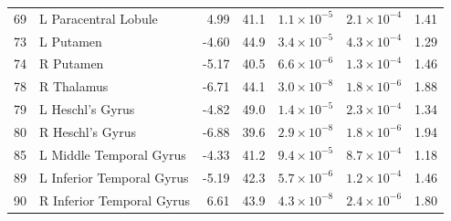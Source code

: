 \documentclass[11pt]{article}
\begin{document}
\begin{longtable}{r p{} r r l l r}
69 & L Paracentral Lobule & 4.99  & 41.1 & $1.1\times10^{-5}$ & $2.1\times10^{-4}$ & 1.41 \\
73 & L Putamen & -4.60 & 44.9 & $3.4\times10^{-5}$ & $4.3\times10^{-4}$ & 1.29 \\
74 & R Putamen & -5.17 & 40.5 & $6.6\times10^{-6}$ & $1.3\times10^{-4}$ & 1.46 \\
78 & R Thalamus & -6.71 & 44.1 & $3.0\times10^{-8}$ & $1.8\times10^{-6}$ & 1.88 \\
79 & L Heschl's Gyrus & -4.82 & 49.0 & $1.4\times10^{-5}$ & $2.3\times10^{-4}$ & 1.34 \\
80 & R Heschl's Gyrus & -6.88 & 39.6 & $2.9\times10^{-8}$ & $1.8\times10^{-6}$ & 1.94 \\
85 & L Middle Temporal Gyrus & -4.33 & 41.2 & $9.4\times10^{-5}$ & $8.7\times10^{-4}$ & 1.18 \\
89 & L Inferior Temporal Gyrus & -5.19 & 42.3 & $5.7\times10^{-6}$ & $1.2\times10^{-4}$ & 1.46 \\
90 & R Inferior Temporal Gyrus & 6.61  & 43.9 & $4.3\times10^{-8}$ & $2.4\times10^{-6}$ & 1.80 \\
\end{longtable}




\end{document}
